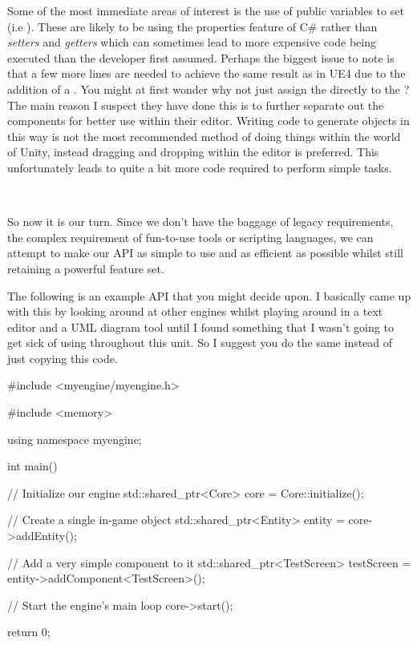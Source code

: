 \documentclass[10pt]{article}
\begin{document}
Some of the most immediate areas of interest is the use of public
variables to set (i.e ). These are likely to be
using the properties feature of C\# rather than \textit{setters} and
\textit{getters} which can sometimes lead to more expensive code being
executed than the developer first assumed. Perhaps the biggest issue to
note is that a few more lines are needed to achieve the same result as in
UE4 due to the addition of a . You might at first wonder
why not just assign the  directly to the ?
The main reason I suspect they have done this is to further separate
out the components for better use within their editor. Writing code to
generate objects in this way is not the most recommended method of doing
things within the world of Unity, instead dragging and dropping within
the editor is preferred. This unfortunately leads to quite a bit more
code required to perform simple tasks.

\

So now it is our turn. Since we don't have the baggage of legacy
requirements, the complex requirement of fun-to-use tools or scripting
languages, we can attempt to make our API as simple to use and as
efficient as possible whilst still retaining a powerful feature set.


The following is an example API that you might decide upon. I basically
came up with this by looking around at other engines whilst playing
around in a text editor and a UML diagram tool until I found something
that I wasn't going to get sick of using throughout this unit. So I
suggest you do the same instead of just copying this code.

\begin{Code}

#include <myengine/myengine.h>

#include <memory>

using namespace myengine;

int main()
{
  // Initialize our engine
  std::shared_ptr<Core> core = Core::initialize();

  // Create a single in-game object
  std::shared_ptr<Entity> entity = core->addEntity();

  // Add a very simple component to it
  std::shared_ptr<TestScreen> testScreen = entity->addComponent<TestScreen>();

  // Start the engine's main loop
  core->start();

  return 0;
}

\end{Code}
\end{document}
